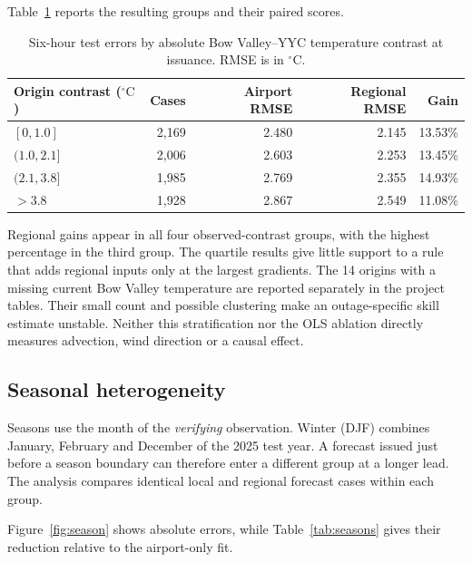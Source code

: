 \documentclass[11pt,letterpaper]{article}
\newcommand{\thead}[1]{\textbf{#1}}\newcommand{\bestscore}[1]{\textbf{#1}}
\newcommand{\celsius}{\ensuremath{^{\circ}\mathrm{C}}}\newcommand{\code}[1]{\texttt{\small #1}}
\begin{document}
Table~\ref{tab:contrast} reports the resulting groups and their paired scores.



\begin{table}[!htbp]
\centering\small
\caption{Six-hour test errors by absolute Bow Valley--YYC temperature contrast at issuance. RMSE is in \celsius.}\label{tab:contrast}
\renewcommand{\arraystretch}{1.10}\begin{tabular*}{.96\linewidth}{@{\extracolsep{\fill}}lrrrr@{}}\toprule\thead{Origin contrast (\celsius)}&\thead{Cases}&\thead{Airport RMSE}&\thead{Regional RMSE}&\thead{Gain}\\\midrule
$[0,1.0]$ & 2,169 & 2.480 & 2.145 & 13.53\% \\
$(1.0,2.1]$ & 2,006 & 2.603 & 2.253 & 13.45\% \\
$(2.1,3.8]$ & 1,985 & 2.769 & 2.355 & 14.93\% \\
$>3.8$ & 1,928 & 2.867 & 2.549 & 11.08\% \\
\bottomrule\end{tabular*}
\end{table}


Regional gains appear in all four observed-contrast groups, with the highest percentage in the third group. The quartile results give little support to a rule that adds regional inputs only at the largest gradients. The 14 origins with a missing current Bow Valley temperature are reported separately in the project tables. Their small count and possible clustering make an outage-specific skill estimate unstable. Neither this stratification nor the OLS ablation directly measures advection, wind direction or a causal effect.


\subsection{Seasonal heterogeneity}\label{seasons}
Seasons use the month of the \emph{verifying} observation. Winter (DJF) combines January, February and December of the 2025 test year. A forecast issued just before a season boundary can therefore enter a different group at a longer lead. The analysis compares identical local and regional forecast cases within each group.

Figure~\ref{fig:season} shows absolute errors, while Table~\ref{tab:seasons} gives their reduction relative to the airport-only fit.
\end{document}
